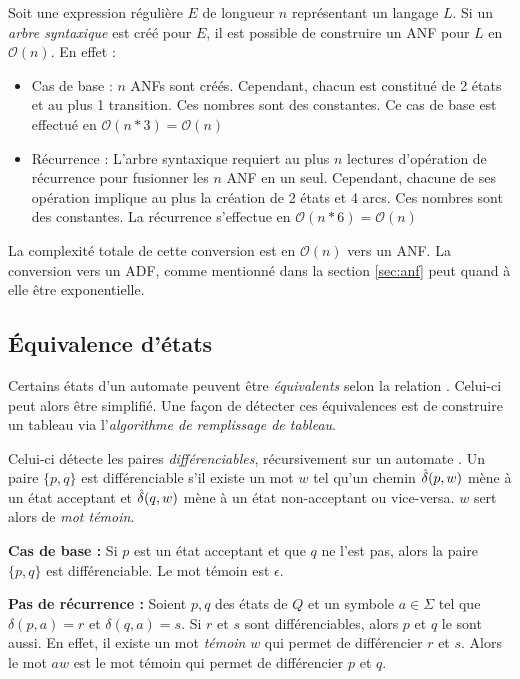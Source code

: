\begin{complexity}
	Soit une expression régulière $E$ de longueur $n$ représentant un langage $L$. Si un \emph{arbre syntaxique} est créé pour $E$, il est possible de construire un ANF pour $L$ en $\mathcal{O}(n)$. En effet :
	\begin{itemize}
		\item Cas de base : $n$ ANFs sont créés. Cependant, chacun est constitué de 2 états et au plus 1 transition. Ces nombres sont des constantes. Ce cas de base est effectué en $\mathcal{O}(n*3)=\mathcal{O}(n)$
		\item Récurrence : L'arbre syntaxique requiert au plus $n$ lectures d'opération de récurrence pour fusionner les $n$ ANF en un seul. Cependant, chacune de ses opération implique au plus la création de 2 états et 4 arcs. Ces nombres sont des constantes. La récurrence s'effectue en $\mathcal{O}(n*6)=\mathcal{O}(n)$
	\end{itemize}
	
	La complexité totale de cette conversion est en $\mathcal{O}(n)$ vers un ANF. La conversion vers un ADF, comme mentionné dans la section \ref{sec:anf} peut quand à elle être exponentielle. 
	
\end{complexity}


\subsection{Équivalence d'états}\label{ss:tfa}
	 
	 Certains états d'un automate peuvent être \emph{équivalents} selon la relation \rm. Celui-ci peut alors être simplifié. Une façon de détecter ces équivalences est de construire un tableau via l'\emph{algorithme de remplissage de tableau}.
	 
	 Celui-ci détecte les paires \emph{différenciables}, récursivement sur un automate \automaton. Un paire $\{p,q\}$ est différenciable s'il existe un mot $w$ tel qu'un chemin $\hat{\delta}(p,w)$ mène à un état acceptant et $\hat{\delta}(q,w)$ mène à un état non-acceptant ou vice-versa. $w$ sert alors de \emph{mot témoin}.
	 
	 \textbf{Cas de base :} Si $p$ est un état acceptant et que $q$ ne l'est pas, alors la paire $\{p,q\}$ est différenciable. Le mot témoin est $\epsilon$.
	 
	 \textbf{Pas de récurrence : } Soient $p,q$ des états de $Q$ et un symbole $a \in \Sigma$ tel que $\delta(p,a)=r$ et $\delta(q,a)=s$. Si $r$ et $s$ sont différenciables, alors $p$ et $q$ le sont aussi. En effet, il existe un mot \emph{témoin} $w$ qui permet de différencier $r$ et $s$. Alors le mot $aw$ est le mot témoin qui permet de différencier $p$ et $q$.
	 
